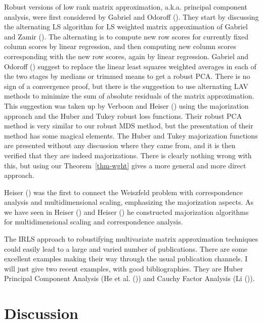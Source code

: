 \documentclass[
  12pt,
  letterpaper,
  DIV=11,
  numbers=noendperiod]{scrartcl}
\newcommand{\sectionbreak}{\pagebreak}
\theoremstyle{definition}
\theoremstyle{definition}
\theoremstyle{plain}
\theoremstyle{plain}
\theoremstyle{plain}
\theoremstyle{remark}
\begin{document}
Robust versions of low rank matrix approximation, a.k.a. principal
component analysis, were first considered by Gabriel and Odoroff
(). They start by discussing the
alternating LS algorithm for LS weighted matrix approximation of Gabriel
and Zamir (). The alternating is to
compute new row scores for currently fixed column scores by linear
regression, and then computing new column scores corresponding with the
new row scores, again by linear regression. Gabriel and Odoroff
() suggest to replace the linear
least squares weighted averages in each of the two stages by medians or
trimmed means to get a robust PCA. There is no sign of a convergence
proof, but there is the suggestion to use alternating LAV methods to
minimize the sum of absolute residuals of the matrix approximation. This
suggestion was taken up by Verboon and Heiser
() using the majorization approach
and the Huber and Tukey robust loss functions. Their robust PCA method
is very similar to our robust MDS method, but the presentation of their
method has some magical elements. The Huber and Tukey majorization
functions are presented without any discussion where they came from, and
it is then verified that they are indeed majorizations. There is clearly
nothing wrong with this, but using our Theorem~\ref{thm-wght} gives a
more general and more direct approach.

Heiser () was the first to connect the
Weiszfeld problem with correspondence analysis and multidimensional
scaling, emphasizing the majorization aspects. As we have seen in Heiser
() and Heiser
() he constructed majorization algorithms
for multidimensional scaling and correspondence analysis.

The IRLS approach to robustifying multivariate matrix approximation
techniques could easily lead to a large and varied number of
publications. There are some excellent examples making their way through
the usual publication channels. I will just give two recent examples,
with good bibliographies. They are Huber Principal Component Analysis
(He et al. ()) and Cauchy Factor
Analysis (Li ()).

\sectionbreak

\section{Discussion}\label{discussion}
\end{document}
